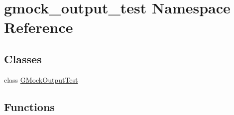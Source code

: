 \hypertarget{namespacegmock__output__test}{}\section{gmock\+\_\+output\+\_\+test Namespace Reference}
\label{namespacegmock__output__test}
\subsection*{Classes}
\begin{DoxyCompactItemize}
\item 
class \mbox{\hyperlink{classgmock__output__test_1_1_g_mock_output_test}{G\+Mock\+Output\+Test}}
\end{DoxyCompactItemize}
\subsection*{Functions}
